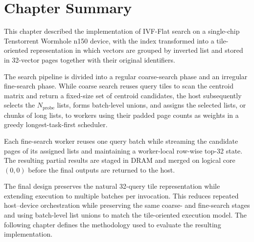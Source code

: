 \section{Chapter Summary}
\label{sec:design-summary}

This chapter described the implementation of IVF-Flat search on a single-chip Tenstorrent Wormhole n150 device, with the index transformed into a tile-oriented representation in which vectors are grouped by inverted list and stored in 32-vector pages together with their original identifiers.

The search pipeline is divided into a regular coarse-search phase and an irregular fine-search phase. While coarse search reuses query tiles to scan the centroid matrix and return a fixed-size set of centroid candidates, the host subsequently selects the \(N_{\mathrm{probe}}\) lists, forms batch-level unions, and assigns the selected lists, or chunks of long lists, to workers using their padded page counts as weights in a greedy longest-task-first scheduler.

Each fine-search worker reuses one query batch while streaming the candidate pages of its assigned lists and maintaining a worker-local row-wise top-32 state. The resulting partial results are staged in DRAM and merged on logical core \((0,0)\) before the final outputs are returned to the host.

The final design preserves the natural 32-query tile representation while extending execution to multiple batches per invocation. This reduces repeated host--device orchestration while preserving the same coarse- and fine-search stages and using batch-level list unions to match the tile-oriented execution model. The following chapter defines the methodology used to evaluate the resulting implementation.
